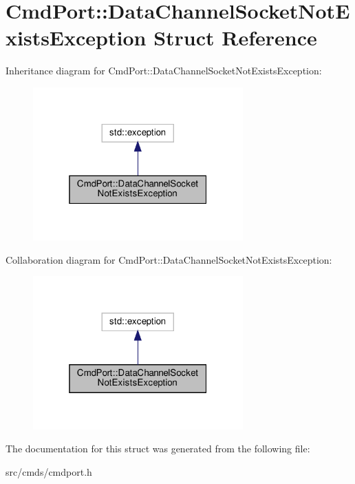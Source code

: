 \hypertarget{structCmdPort_1_1DataChannelSocketNotExistsException}{}\section{Cmd\+Port\+:\+:Data\+Channel\+Socket\+Not\+Exists\+Exception Struct Reference}
\label{structCmdPort_1_1DataChannelSocketNotExistsException}


Inheritance diagram for Cmd\+Port\+:\+:Data\+Channel\+Socket\+Not\+Exists\+Exception\+:
\nopagebreak
\begin{figure}[H]
\begin{center}
\leavevmode
\includegraphics[width=229pt]{structCmdPort_1_1DataChannelSocketNotExistsException__inherit__graph}
\end{center}
\end{figure}


Collaboration diagram for Cmd\+Port\+:\+:Data\+Channel\+Socket\+Not\+Exists\+Exception\+:
\nopagebreak
\begin{figure}[H]
\begin{center}
\leavevmode
\includegraphics[width=229pt]{structCmdPort_1_1DataChannelSocketNotExistsException__coll__graph}
\end{center}
\end{figure}


The documentation for this struct was generated from the following file\+:\begin{DoxyCompactItemize}
\item 
src/cmds/cmdport.\+h\end{DoxyCompactItemize}
